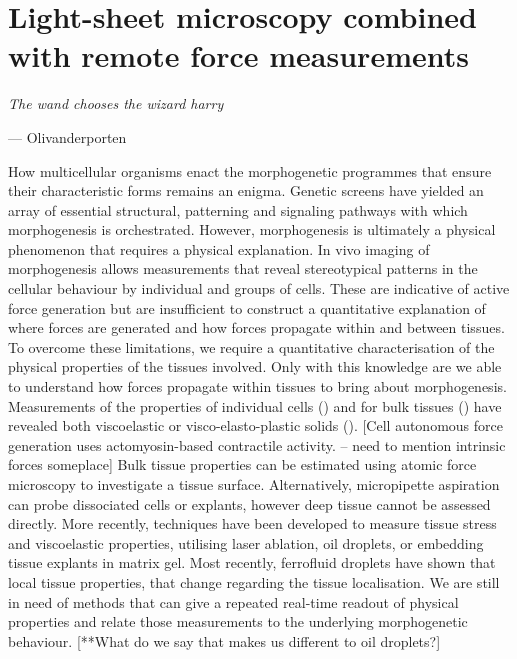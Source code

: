 \ifpdf
    \graphicspath{{Chapter/tweezers/Figs/Raster/}{Chapter/tweezers/Figs/PDF/}{Chapter/tweezers/Figs/}}
\else
    \graphicspath{{Chapter/tweezers/Figs/Vector/}{Chapter/tweezers/Figs/}}
\fi

\chapter[Light-sheet microscopy combined with remote force measurements]{Light-sheet microscopy combined with remote force measurements}%
\epigraph{\textit{The wand chooses the wizard harry}}{--- Olivanderporten}
How multicellular organisms enact the morphogenetic programmes that ensure their characteristic forms remains an enigma.
Genetic screens have yielded an array of essential structural, patterning and signaling pathways with which morphogenesis is orchestrated.
However, morphogenesis is ultimately a physical phenomenon that requires a physical explanation.
In vivo imaging of morphogenesis allows measurements that reveal stereotypical patterns in the cellular behaviour by individual and groups of cells.
These are indicative of active force generation but are insufficient to construct a quantitative explanation of where forces are generated and how forces propagate within and between tissues.
To overcome these limitations, we require a quantitative characterisation of the physical properties of the tissues involved.
Only with this knowledge are we able to understand how forces propagate within tissues to bring about morphogenesis.
Measurements of the properties of individual cells () and for bulk tissues () have revealed both viscoelastic or visco-elasto-plastic solids ().
[Cell autonomous force generation uses actomyosin-based contractile activity. – need to mention intrinsic forces someplace]   Bulk tissue properties can be estimated using atomic force microscopy to investigate a tissue surface.
Alternatively, micropipette aspiration can probe dissociated cells or explants, however deep tissue cannot be assessed directly.
More recently, techniques have been developed to measure tissue stress and viscoelastic properties, utilising laser ablation,  oil droplets, or embedding tissue explants in matrix gel.
Most recently, ferrofluid droplets have shown that local tissue properties, that change regarding the tissue localisation.
We are still in need of methods that can give a repeated real-time readout of physical properties and relate those measurements to the underlying morphogenetic behaviour.
[**What do we say that makes us different to oil droplets?]

